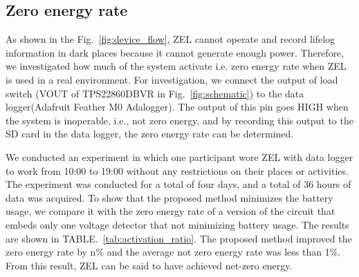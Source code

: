 \documentclass[conference]{IEEEtran}
\begin{document}
\subsection{Zero energy rate}
\begin{comment}
図で示すように提案システムは暗い場所では十分な発電量の確保ができないため、動作できずライフログ情報の記録ができない。そこで、実環境で提案システムを使用した場合にどれくらいの割合でシステムが動作をしているかの調査を行った。
調査のためにパワースイッチング用のボルテージデティクター（図のTh1)をデータロガーに接続した。
ボルテージディテクターの出力をロガー内のSDカードに記録することでシステムの動作割合がわかる。
なぜならharvesting energyが動作保証電圧を下回った場合ボルテージディテクターの出力がLowとなるためである。
このロガー付きの名札センサを着用して、午前10時から午後19時まで行動や場所の制限なく作業を行う実験を行った。実験は計4日間行い、計36時間分のデータを取得した。
実験結果を表に示す。
4日間を平均システムが動作保証外となった割合は1\%未満にとどまった。このことから提案システムは実適用した場合でも十分な適用範囲を持つことが可能であると示された。
\end{comment}
As shown in the Fig.~\ref{fig:device_flow}, ZEL cannot operate and record lifelog information in dark places because it cannot generate enough power.
Therefore, we investigated how much of the system activate i.e. zero energy rate when ZEL is used in a real environment.
For investigation, we connect the output of load switch (VOUT of TPS22860DBVR in Fig.~\ref{fig:schematic}) to the data logger(Adafruit Feather M0 Adalogger).
The output of this pin goes HIGH when the system is inoperable, i.e., not zero energy, and by recording this output to the SD card in the data logger, the zero energy rate can be determined.

We conducted an experiment in which one participant wore ZEL with data logger to work from 10:00 to 19:00 without any restrictions on their places or activities.
The experiment was conducted for a total of four days, and a total of 36 hours of data was acquired.
To show that the proposed method minimizes the battery usage, we compare it with the zero energy rate of a version of the circuit that embeds only one voltage detector that not minimizing battery usage.
The results are shown in TABLE.~\ref{tab:activation_ratio}.
The proposed method improved the zero energy rate by n\% and the average not zero energy rate was less than 1\%.
From this result, ZEL can be said to have achieved net-zero energy.
\end{document}
